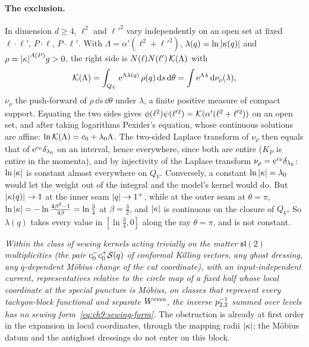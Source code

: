 \paragraph{The exclusion.}
In dimension $d \ge 4$, $\ell^2$ and $\ell'^2$ vary independently on an open set at fixed $\ell \cdot \ell'$, $P \cdot \ell$, $P \cdot \ell'$.
With $\Lambda = \alpha' (\ell^2 + \ell'^2)$, $\lambda(q) = \ln {|\kappa(q)|}$ and $\rho = {|\kappa|}^{A(P)} g > 0$, the right side is $N(\ell) N(\ell') \, {\mathcal{K}}(\Lambda)$ with
\begin{equation}
  \label{eq:ch9:laplace}
  {\mathcal{K}}(\Lambda)
    = \int_{Q_V} \mathrm{e}^{\Lambda \lambda(q)} \, \rho(q) \, \mathrm{d} s \, \mathrm{d} \theta
    = \int \mathrm{e}^{\Lambda \lambda} \, \mathrm{d} \nu_\rho(\lambda),
\end{equation}
$\nu_\rho$ the push-forward of $\rho \, \dd s \, \dd \theta$ under $\lambda$, a finite positive measure of compact support.
Equating the two sides gives $\phi(\ell^2) \psi(\ell'^2) = {\mathcal{K}}(\alpha' (\ell^2 + \ell'^2))$ on an open set, and after taking logarithms Pexider's equation, whose continuous solutions are affine: $\ln {\mathcal{K}}(\Lambda) = c_0 + \lambda_0 \Lambda$.
The two-sided Laplace transform of $\nu_\rho$ then equals that of $\mathrm{e}^{c_0} \delta_{\lambda_0}$ on an interval, hence everywhere, since both are entire ($K_P$ is entire in the momenta), and by injectivity of the Laplace transform $\nu_\rho = \mathrm{e}^{c_0} \delta_{\lambda_0}$: $\ln {|\kappa|}$ is constant almost everywhere on $Q_V$.
Conversely, a constant $\ln {|\kappa|} = \lambda_0$ would let the weight out of the integral and the model's kernel would do.
But ${|\kappa(q)|} \to 1$ at the inner seam ${|q|} \to 1^+$, while at the outer seam at $\theta = \pi$, $\ln {|\kappa|} = - \ln \tfrac{4 \beta^2 - 1}{4 \beta} = \ln \tfrac34$ at $\beta = \tfrac32$, and ${|\kappa|}$ is continuous on the closure of $Q_V$.
So $\lambda(q)$ takes every value in $[\ln \tfrac34, 0]$ along the ray $\theta = \pi$, and is not constant.

\medskip

\noindent
\emph{Within the class of sewing kernels acting trivially on the matter $\mathfrak{sl}(2)$ multiplicities (the pair $c_0^- c_0^+ {\mathcal{S}}(q)$ of conformal Killing vectors, any ghost dressing, any $q$-dependent Möbius change of the cut coordinate), with an input-independent current, representatives relative to the circle map of a fixed half whose local coordinate at the special puncture is Möbius, on classes that represent every tachyon-block functional and separate $W^{\rm even}$, the inverse $p_{2,2}^{-1}$ summed over levels has no sewing form~\eqref{eq:ch9:sewing-form}.}
The obstruction is already at first order in the expansion in local coordinates, through the mapping radii ${|\kappa|}$; the Möbius datum and the antighost dressings do not enter on this block.

